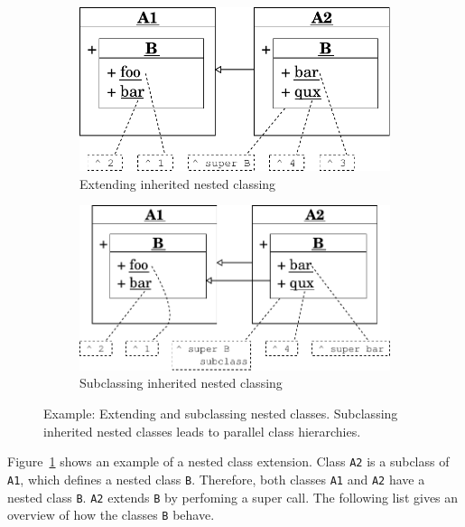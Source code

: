 \begin{figure}[!htp]
\begin{subfigure}[b]{\textwidth}
	\centering
	\includegraphics[scale=0.75]{nested_super_1.pdf}
	\caption{Extending inherited nested classing}
	\label{fig:impl:extend_inherited_class}
\end{subfigure}

\vspace{15pt}

\begin{subfigure}[b]{\textwidth}
	\centering
	\includegraphics[scale=0.75]{nested_super_2.pdf}
	\caption{Subclassing inherited nested classing}
	\label{fig:impl:subclass_inherited_class}
\end{subfigure}

\caption[Example: Extending/subclassing nested classes]{Example: Extending and subclassing nested classes. Subclassing inherited nested classes leads to parallel class hierarchies.}
\end{figure}

Figure~\ref{fig:impl:extend_inherited_class} shows an example of a nested class extension. Class \texttt{A2} is a subclass of \texttt{A1}, which defines a nested class \texttt{B}. Therefore, both classes \texttt{A1} and \texttt{A2} have a nested class \texttt{B}. \texttt{A2} extends \texttt{B} by perfoming a super call. The following list gives an overview of how the classes \texttt{B} behave.

